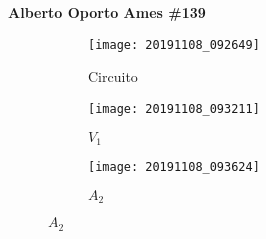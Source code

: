 \documentclass{article}
\begin{document}
\textbf{Alberto Oporto Ames \#139}
\thispagestyle{fancy}

\begin{figure}[h]
	\begin{subfigure}{0.48\textwidth}
		\centering
		\texttt{[image: 20191108\_092649]}
		\caption{Circuito}%
		\label{fig:circuito}
	\end{subfigure}
	\begin{subfigure}{0.48\textwidth}
		\centering
		\texttt{[image: 20191108\_093211]}
		\caption{$V_1$}%
		\label{fig:v1}
	\end{subfigure}

	\vspace{0.5cm}
	\centering
	\begin{subfigure}{0.48\textwidth}
		\centering
		\texttt{[image: 20191108\_093624]}
		\caption{$A_2$}%
		\label{fig:a2}
	\end{subfigure}
\end{figure}
\end{document}
